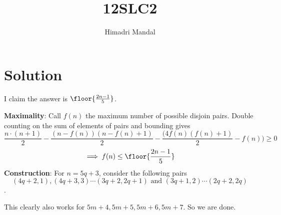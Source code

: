 \documentclass[11pt]{scrartcl}
\title{12SLC2}
\author{Himadri Mandal}
\begin{document}
\maketitle

\section{Solution}
\begin{soln}
	I claim the answer is $\floor{\frac{2n-1}{5}}$.
	\raggedright

	\textbf{Maximality}:
		Call $f(n)$ the maximum number of possible disjoin pairs.
		Double counting on the sum of elements of pairs and bounding gives
		$$\frac{n\cdot(n+1)}2 - \frac{(n-f(n))(n-f(n)+1)}2 - \frac{(4f(n)(f(n)+1)}2 -f(n)) \geq 0$$
		$$\implies f(n) \leq \floor{\frac{2n-1}5}$$
	\textbf{Construction}:
		For $n = 5q + 3$, consider the following pairs
		$$( 4q+2,1),(4q+3,3) \cdots (3q+2,2q+1) \text{ and } (3q+1,2)\cdots (2q+2,2q)$$.

		This clearly also works for $5m+4,5m+5, 5m+6,5m+7$. So we are done.
\end{soln}
\end{document}
